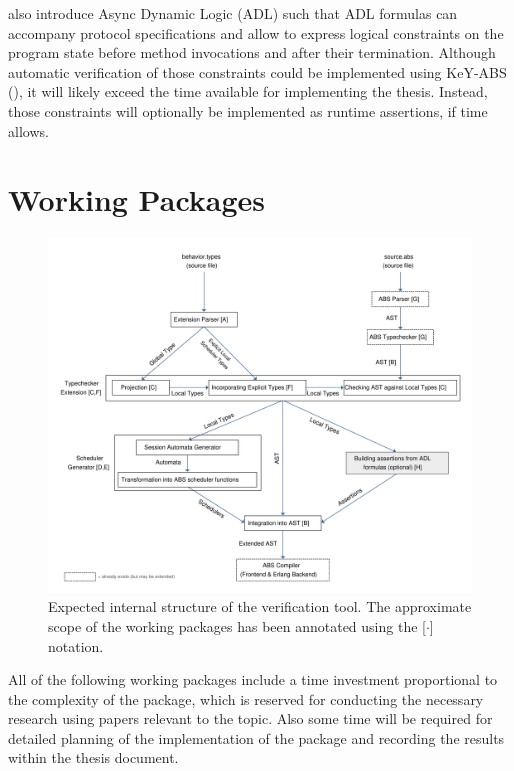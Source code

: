 \documentclass[paper=a4,nochapname,accentcolor=tud9c]{tudexercise}
\newcommand\textcitep[1]{\mkbibparens{\textcite{#1}}}
\begin{document}

\textcite{kamburjan2018stateful} also introduce Async Dynamic Logic (ADL) such that ADL formulas can
accompany protocol specifications and allow to express logical constraints on the
program state before method invocations and after their termination.
Although automatic verification of those constraints could  be implemented using
KeY-ABS \textcitep{din2015key}, it will likely exceed the time available for
implementing the thesis.
Instead, those constraints will optionally be implemented as runtime assertions,
if time allows.

\section{Working Packages}\label{workpackages}
%
\begin{figure}[H]
  \centering
  \includegraphics[width=\linewidth]{assets/architecture.pdf}
  \caption{Expected internal structure of the verification tool. The approximate scope of the working packages has been annotated using the [$\cdot$] notation.}
\end{figure}

All of the following working packages include a time investment proportional to the
complexity of the package, which is reserved for conducting the necessary
research using papers relevant to the topic. Also some time will be required for
detailed planning of the implementation of the package and recording the results
within the thesis document.
\end{document}

